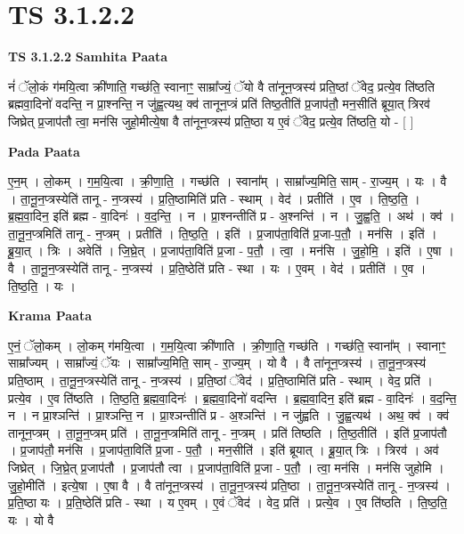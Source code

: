 \documentclass[17pt]{extarticle}
\begin{document}
\section{ TS 3.1.2.2 }

\textbf{TS 3.1.2.2 } \newline
\textbf{Samhita Paata} \newline

नं॑ ॅलो॒कं ग॑मयि॒त्वा क्री॑णाति॒ गच्छ॑ति॒ स्वानाꣳ॒॒ साम्रा᳚ज्यं॒ ॅयो वै ता॑नून॒प्त्रस्य॑ प्रति॒ष्ठां ॅवेद॒ प्रत्ये॒व ति॑ष्ठति ब्रह्मवा॒दिनो॑ वदन्ति॒ न प्रा॒श्नन्ति॒ न जु॑ह्व॒त्यथ॒ क्व॑ तानून॒प्त्रं प्रति॑ तिष्ठ॒तीति॑ प्र॒जाप॑तौ॒ मन॒सीति॑ ब्रूया॒त् त्रिरव॑ जिघ्रेत् प्र॒जाप॑तौ त्वा॒ मन॑सि जुहो॒मीत्ये॒षा वै ता॑नून॒प्त्रस्य॑ प्रति॒ष्ठा य ए॒वं ॅवेद॒ प्रत्ये॒व ति॑ष्ठति॒ यो - [  ] \newline

\textbf{Pada Paata} \newline

ए॒न॒म् । लो॒कम् । ग॒म॒यि॒त्वा । क्री॒णा॒ति॒ । गच्छ॑ति । स्वाना᳚म् । साम्रा᳚ज्य॒मिति॒ साम् - रा॒ज्य॒म् । यः । वै । ता॒नू॒न॒प्त्रस्येति॑ तानू - न॒प्त्रस्य॑ । प्र॒ति॒ष्ठामिति॑ प्रति - स्थाम् । वेद॑ । प्रतीति॑ । ए॒व । ति॒ष्ठ॒ति॒ । ब्र॒ह्म॒वा॒दिन॒ इति॑ ब्रह्म - वा॒दिनः॑ । व॒द॒न्ति॒ । न । प्रा॒श्नन्तीति॑ प्र - अ॒श्नन्ति॑ । न । जु॒ह्व॒ति॒ । अथ॑ । क्व॑ । ता॒नू॒न॒प्त्रमिति॑ तानू - न॒प्त्रम् । प्रतीति॑ । ति॒ष्ठ॒ति॒ । इति॑ । प्र॒जाप॑ता॒विति॑ प्र॒जा-प॒तौ॒ । मन॑सि । इति॑ । ब्रू॒या॒त् । त्रिः । अवेति॑ । जि॒घ्रे॒त् । प्र॒जाप॑ता॒विति॑ प्र॒जा - प॒तौ॒ । त्वा॒ । मन॑सि । जु॒हो॒मि॒ । इति॑ । ए॒षा । वै । ता॒नू॒न॒प्त्रस्येति॑ तानू - न॒प्त्रस्य॑ । प्र॒ति॒ष्ठेति॑ प्रति - स्था । यः । ए॒वम् । वेद॑ । प्रतीति॑ । ए॒व । ति॒ष्ठ॒ति॒ । यः ।  \newline


\textbf{Krama Paata} \newline

ए॒नं॒ ॅलो॒कम् । लो॒कम् ग॑मयि॒त्वा । ग॒म॒यि॒त्वा क्री॑णाति । क्री॒णा॒ति॒ गच्छ॑ति । गच्छ॑ति॒ स्वाना᳚म् । स्वानाꣳ॒॒ साम्रा᳚ज्यम् । साम्रा᳚ज्यं॒ ॅयः । साम्रा᳚ज्य॒मिति॒ साम् - रा॒ज्य॒म् । यो वै । वै ता॑नून॒प्त्रस्य॑ । ता॒नू॒न॒प्त्रस्य॑ प्रति॒ष्ठाम् । ता॒नू॒न॒प्त्रस्येति॑ तानू - न॒प्त्रस्य॑ । प्र॒ति॒ष्ठां ॅवेद॑ । प्र॒ति॒ष्ठामिति॑ प्रति - स्थाम् । वेद॒ प्रति॑ । प्रत्ये॒व । ए॒व ति॑ष्ठति । ति॒ष्ठ॒ति॒ ब्र॒ह्म॒वा॒दिनः॑ । ब्र॒ह्म॒वा॒दिनो॑ वदन्ति । ब्र॒ह्म॒वा॒दिन॒ इति॑ ब्रह्म - वा॒दिनः॑ । व॒द॒न्ति॒ न । न प्रा॒श्ञन्ति॑ । प्रा॒श्ञन्ति॒ न । प्रा॒श्ञन्तीति॑ प्र - अ॒श्ञन्ति॑ । न जु॑ह्वति । जु॒ह्व॒त्यथ॑ । अथ॒ क्व॑ । क्व॑ तानून॒प्त्रम् । ता॒नू॒न॒प्त्रम् प्रति॑ । ता॒नू॒न॒प्त्रमिति॑ तानू - न॒प्त्रम् । प्रति॑ तिष्ठति । ति॒ष्ठ॒तीति॑ । इति॑ प्र॒जाप॑तौ । प्र॒जाप॑तौ॒ मन॑सि । प्र॒जाप॑ता॒विति॑ प्र॒जा - प॒तौ॒ । मन॒सीति॑ । इति॑ ब्रूयात् । ब्रू॒या॒त् त्रिः । त्रिरव॑ । अव॑ जिघ्रेत् । जि॒घ्रे॒त् प्र॒जाप॑तौ । प्र॒जाप॑तौ त्वा । प्र॒जाप॑ता॒विति॑ प्र॒जा - प॒तौ॒ । त्वा॒ मन॑सि । मन॑सि जुहोमि । जु॒हो॒मीति॑ । इत्ये॒षा । ए॒षा वै । वै ता॑नून॒प्त्रस्य॑ । ता॒नू॒न॒प्त्रस्य॑ प्रति॒ष्ठा । ता॒नू॒न॒प्त्रस्येति॑ तानू - न॒प्त्रस्य॑ । प्र॒ति॒ष्ठा यः । प्र॒ति॒ष्ठेति॑ प्रति - स्था । य ए॒वम् । ए॒वं ॅवेद॑ । वेद॒ प्रति॑ । प्रत्ये॒व । ए॒व ति॑ष्ठति । ति॒ष्ठ॒ति॒ यः । यो वै \newline
\end{document}
